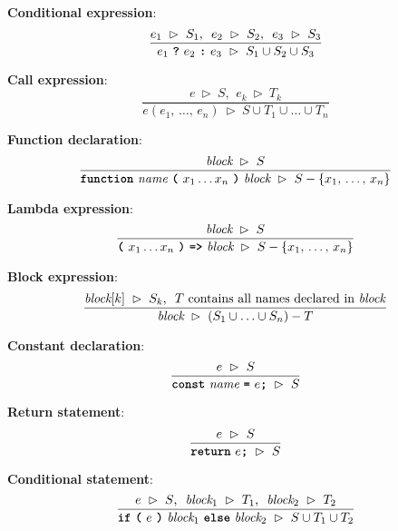 \vspace{10mm}
\textbf{Conditional expression}:
\[
\frac{
  e_1 \ \rhd \ S_1
  \text{, } \
  e_2 \ \rhd \ S_2
  \text{, } \
  e_3 \ \rhd \ S_3
}{  
  e_1\  \textbf{\texttt{?}}\ e_2\ \textbf{\texttt{:}}\ e_3
  \ \rhd \
  S_1 \cup S_2 \cup S_3
}
\]

\vspace{10mm}
\textbf{Call expression}:
\[
\frac{
  e \ \rhd \ S
  \text{, } \
  e_k \ \rhd \ T_k
}{  
  e(e_1,\, \ldots,\, e_n)
  \ \rhd \
  S \cup T_1 \cup \ldots \cup T_n
}
\]

\vspace{10mm}
\textbf{Function declaration}:
\[
\frac{
  \textit{block} \ \rhd \ S
}{  
  \textbf{\texttt{function}}\  \textit{name} \ \textbf{\texttt{(}}\ x_1 \ldots x_n \ \textbf{\texttt{)}}\ \textit{block}
  \ \rhd \
  S - \{x_1,\, \ldots,\, x_n\}
}
\]

\vspace{10mm}
\textbf{Lambda expression}:
\[
\frac{
  \textit{block} \ \rhd \ S
}{  
  \textbf{\texttt{(}}\ x_1 \ldots x_n \ \textbf{\texttt{)}}\ \textbf{\texttt{=>}}\ \textit{block}
  \ \rhd \
  S - \{x_1,\, \ldots,\, x_n\}
}
\]

\vspace{10mm}
\textbf{Block expression}:
\[
\frac{
  \textit{block}[k] \ \rhd \ S_k
  \text{, } \
  T \text{ contains all names declared in \textit{block}}
}{  
  \textit{block}
  \ \rhd \
  (S_1 \cup \ldots \cup S_n) - T
}
\]

\vspace{10mm}
\textbf{Constant declaration}:
\[
\frac{
  e \ \rhd \ S
}{  
  \textbf{\texttt{const}}\  \textit{name} \ 
             \textbf{\texttt{=}}\ e\textbf{\texttt{;}}
  \ \rhd \
  S
}
\]

\vspace{10mm}
\textbf{Return statement}:
\[
\frac{
  e \ \rhd \ S
}{  
  \textbf{\texttt{return}}\ e\textbf{\texttt{;}}
  \ \rhd \
  S
}
\]

\vspace{10mm}
\textbf{Conditional statement}:
\[
\frac{
  e \ \rhd \ S
  \text{, } \
  \textit{block}_1 \ \rhd \ T_1
  \text{, } \
  \textit{block}_2 \ \rhd \ T_2
}{  
  \textbf{\texttt{if}}\ 
  \textbf{\texttt{(}}\ 
  e \ 
  \textbf{\texttt{)}} \ 
  \textit{block}_1 \
  \textbf{\texttt{else}} \ 
  \textit{block}_2
  \ \rhd \
  S \cup T_1 \cup T_2
}
\]

